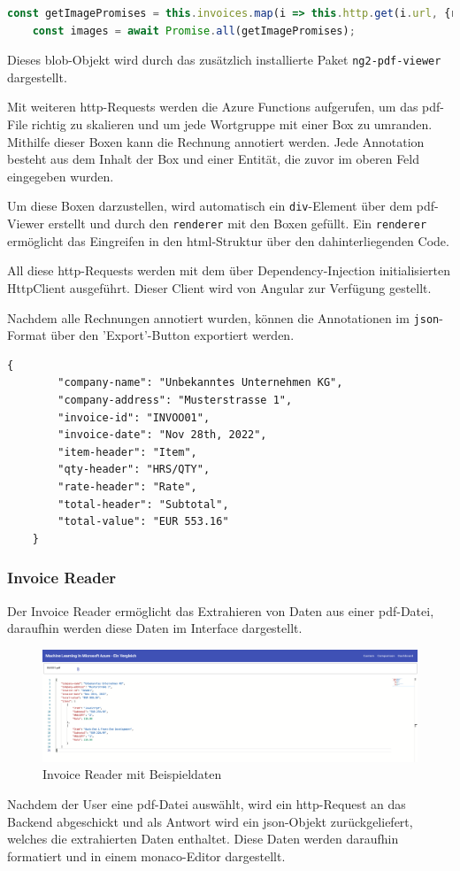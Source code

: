 \begin{lstlisting}[language=TypeScript, caption = {HTTP-GET-Requests für die pdf-Dateien}]
    const getImagePromises = this.invoices.map(i => this.http.get(i.url, {responseType: 'blob'}).toPromise());
    const images = await Promise.all(getImagePromises);
\end{lstlisting}

Dieses blob-Objekt wird durch das zusätzlich installierte Paket \lstinline{ng2-pdf-viewer} dargestellt. 

Mit weiteren \gls{http}-Requests werden die Azure Functions aufgerufen, um das pdf-File richtig zu skalieren und um jede Wortgruppe mit einer Box zu umranden. Mithilfe dieser Boxen kann die Rechnung annotiert werden. Jede Annotation besteht aus dem Inhalt der Box und einer Entität, die zuvor im oberen Feld eingegeben wurden. 

Um diese Boxen darzustellen, wird automatisch ein \lstinline{div}-Element über dem pdf-Viewer erstellt und durch den \lstinline{renderer} mit den Boxen gefüllt. Ein \lstinline{renderer} ermöglicht das Eingreifen in den \gls{html}-Struktur über den dahinterliegenden Code.

All diese \gls{http}-Requests werden mit dem über Dependency-Injection initialisierten HttpClient ausgeführt. Dieser Client wird von Angular zur Verfügung gestellt.

Nachdem alle Rechnungen annotiert wurden, können die Annotationen im \lstinline{json}-Format über den 'Export'-Button exportiert werden.

\begin{lstlisting}[caption={Beispiel für eine exportierte json-Datei}]
    {
        "company-name": "Unbekanntes Unternehmen KG",
        "company-address": "Musterstrasse 1",
        "invoice-id": "INVOO01",
        "invoice-date": "Nov 28th, 2022",
        "item-header": "Item",
        "qty-header": "HRS/QTY",
        "rate-header": "Rate",
        "total-header": "Subtotal",
        "total-value": "EUR 553.16"
    }
\end{lstlisting}

\subsubsection{Invoice Reader}

Der Invoice Reader ermöglicht das Extrahieren von Daten aus einer pdf-Datei, daraufhin werden diese Daten im Interface dargestellt.

\begin{figure}[H]
    \centering
    \includegraphics[scale=0.25]{sections/implementation/images/InvoiceReader.png}
    \caption{Invoice Reader mit Beispieldaten}
\end{figure}

Nachdem der User eine pdf-Datei auswählt, wird ein \gls{http}-Request an das Backend abgeschickt und als Antwort wird ein json-Objekt zurückgeliefert, welches die extrahierten Daten enthaltet. Diese Daten werden daraufhin formatiert und in einem monaco-Editor dargestellt.

